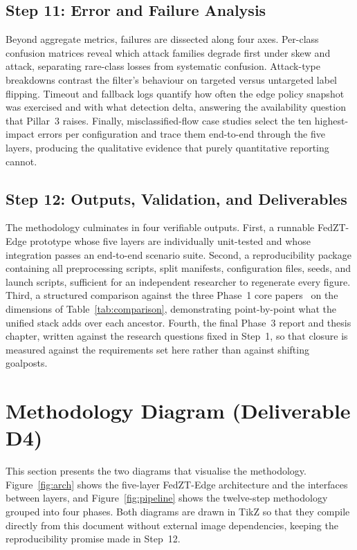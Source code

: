 \documentclass[11pt,a4paper]{article}
\newcommand{\bigsection}[1]{\Needspace*{0.22\textheight}\section{#1}}
\begin{document}
\subsection{Step 11: Error and Failure Analysis}\label{sec:step11}

Beyond aggregate metrics, failures are dissected along four axes. Per-class
confusion matrices reveal which attack families degrade first under skew
and attack, separating rare-class losses from systematic confusion.
Attack-type breakdowns contrast the filter's behaviour on targeted versus
untargeted label flipping. Timeout and fallback logs quantify how often
the edge policy snapshot was exercised and with what detection delta,
answering the availability question that Pillar~3 raises. Finally,
misclassified-flow case studies select the ten highest-impact errors per
configuration and trace them end-to-end through the five layers, producing
the qualitative evidence that purely quantitative reporting cannot.

\subsection{Step 12: Outputs, Validation, and Deliverables}
\label{sec:step12}

The methodology culminates in four verifiable outputs. First, a runnable
FedZT-Edge prototype whose five layers are individually unit-tested and
whose integration passes an end-to-end scenario suite. Second, a
reproducibility package containing all preprocessing scripts, split
manifests, configuration files, seeds, and launch scripts, sufficient for
an independent researcher to regenerate every figure. Third, a structured
comparison against the three Phase~1 core papers~\cite{flexids,mahida2026,
weber2026} on the dimensions of Table~\ref{tab:comparison}, demonstrating
point-by-point what the unified stack adds over each ancestor. Fourth, the
final Phase~3 report and thesis chapter, written against the research
questions fixed in Step~1, so that closure is measured against the
requirements set here rather than against shifting goalposts.

\bigsection{Methodology Diagram (Deliverable D4)}\label{sec:diagram}

This section presents the two diagrams that visualise the methodology.
Figure~\ref{fig:arch} shows the five-layer FedZT-Edge architecture and the
interfaces between layers, and Figure~\ref{fig:pipeline} shows the
twelve-step methodology grouped into four phases. Both diagrams are drawn
in TikZ so that they compile directly from this document without external
image dependencies, keeping the reproducibility promise made in
Step~12.
\end{document}
